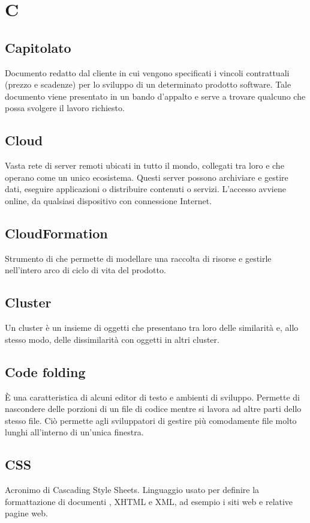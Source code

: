 \section*{C}
\markright{}

\subsection*{Capitolato}
Documento redatto dal cliente in cui vengono specificati i vincoli contrattuali (prezzo e scadenze) per lo sviluppo di un determinato prodotto software. Tale documento viene presentato in un bando d'appalto e serve a trovare qualcuno che possa svolgere il lavoro richiesto.

\subsection*{Cloud}
Vasta rete di server remoti ubicati in tutto il mondo, collegati tra loro e che operano come un unico ecosistema. Questi server possono archiviare e gestire dati, eseguire applicazioni o distribuire contenuti o servizi. L'accesso avviene online, da qualsiasi dispositivo con connessione Internet.

\subsection*{CloudFormation}
Strumento di  che permette di modellare una raccolta di risorse  e gestirle nell'intero arco di ciclo di vita del prodotto.

\subsection*{Cluster}
Un cluster è un insieme di oggetti che presentano tra loro delle similarità e, allo stesso modo, delle dissimilarità con oggetti in altri cluster.

\subsection*{Code folding}
È una caratteristica di alcuni editor di testo e ambienti di sviluppo. Permette di nascondere delle porzioni di un file di codice mentre si lavora ad altre parti dello stesso file. Ciò permette agli sviluppatori di gestire più comodamente file molto lunghi all'interno di un'unica finestra.

\subsection*{CSS}
Acronimo di Cascading Style Sheets. Linguaggio usato per definire la formattazione di documenti , XHTML e XML, ad esempio i siti web e relative pagine web.

